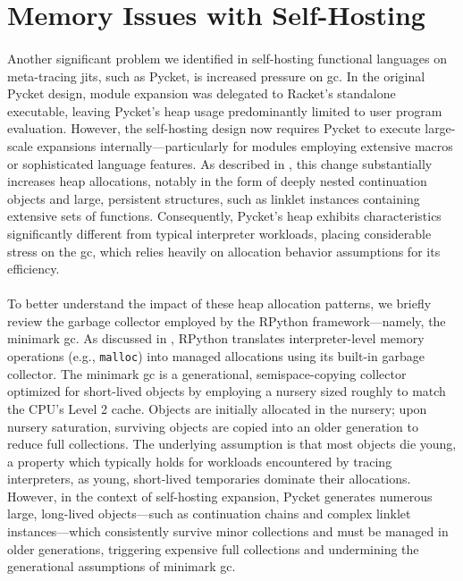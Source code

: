 	\section[\texorpdfstring{Memory Issues with Self-Hosting}{Memory Issues}]{Memory Issues with Self-Hosting}
	\label{section:memory}

		\paragraph{}%
			Another significant problem we identified in self-hosting functional languages on meta-tracing \glspl{jit}, such as Pycket, is increased pressure on \gls{gc}. In the original Pycket design, module expansion was delegated to Racket's standalone executable, leaving Pycket's heap usage predominantly limited to user program evaluation. However, the self-hosting design now requires Pycket to execute large-scale expansions internally—particularly for modules employing extensive macros or sophisticated language features. As described in , this change substantially increases heap allocations, notably in the form of deeply nested continuation objects and large, persistent structures, such as linklet instances containing extensive sets of functions. Consequently, Pycket's heap exhibits characteristics significantly different from typical interpreter workloads, placing considerable stress on the \gls{gc}, which relies heavily on allocation behavior assumptions for its efficiency.

		\paragraph{}%
			To better understand the impact of these heap allocation patterns, we briefly review the garbage collector employed by the RPython framework—namely, the minimark \gls{gc}. As discussed in , RPython translates interpreter-level memory operations (e.g., \texttt{malloc}) into managed allocations using its built-in garbage collector. The minimark \gls{gc} is a generational, semispace-copying collector optimized for short-lived objects by employing a nursery sized roughly to match the CPU's Level 2 cache. Objects are initially allocated in the nursery; upon nursery saturation, surviving objects are copied into an older generation to reduce full collections. The underlying assumption is that most objects die young, a property which typically holds for workloads encountered by tracing interpreters, as young, short-lived temporaries dominate their allocations. However, in the context of self-hosting expansion, Pycket generates numerous large, long-lived objects—such as continuation chains and complex linklet instances—which consistently survive minor collections and must be managed in older generations, triggering expensive full collections and undermining the generational assumptions of minimark \gls{gc}. \cite{pypy06, bolzPhDThesis, gc:16, LuaJITLanguageToolkit}

